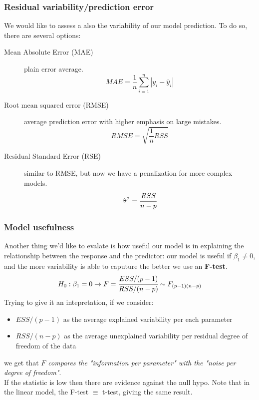 \subsubsection{Residual variability/prediction error}
We would like to assess a also the variability of our model prediction. To do so, there are several options:
\begin{description}
    \item[Mean Absolute Error (MAE)] 
    plain error average.
    \begin{equation*}
        MAE = \frac{1}{n}\sum_{i=1}^{n}|y_i-\hat{y}_i|
    \end{equation*}
    
    \item[Root mean squared error (RMSE)]
    average prediction error with higher emphasis on large mistakes.    
    \begin{equation*}
        RMSE = \sqrt{\frac{1}{n}RSS}
    \end{equation*}

    \item[Residual Standard Error (RSE)] 
    similar to RMSE, but now we have a penalization for more complex models.
    \begin{equation*}
        \hat{\sigma}^2=\cfrac{RSS}{n-p}
    \end{equation*}
    

\end{description}


\subsubsection{Model usefulness}
Another thing we'd like to evalate is how useful our model is in explaining the relationship between the response and the predictor: our model is useful if $\beta_1\ne 0$, and the more variability is able to caputure the better \arrow we use an \textbf{F-test}.
\begin{equation*}
    H_0:\beta_1 = 0 \rightarrow F=\cfrac{ESS/(p-1)}{RSS/(n-p)}\sim F_{(p-1)(n-p)}
\end{equation*}
Trying to give it an intepretation, if we consider:
\begin{itemize}
    \item $ESS/(p-1)$ as the average explained variability per each parameter
    \item $RSS/(n-p)$ as the average unexplained variability per residual degree of freedom of the data
\end{itemize}
we get that \textit{$F$ compares the "information per parameter" with the "noise per degree of freedom"}.\\
If the statistic is low then there are evidence against the null hypo. Note that in the linear model, the F-test $\equiv$ t-test, giving the same result.


